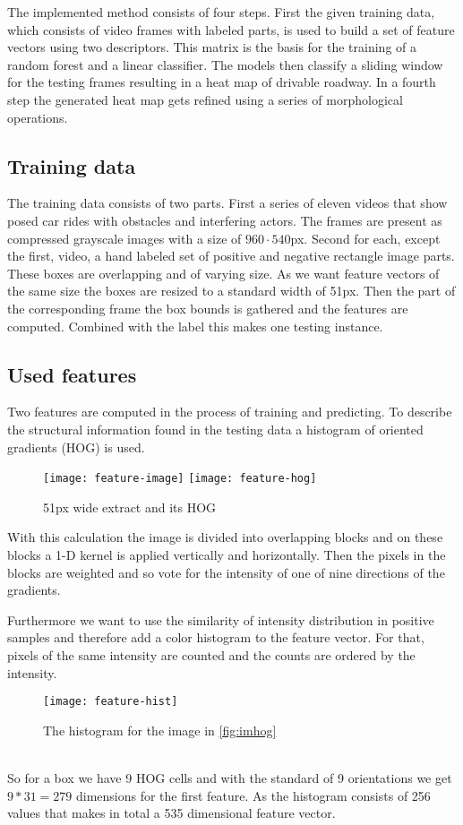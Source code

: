 The implemented method consists of four steps. First the given training data, which consists of video frames with labeled parts, is used to build a set of feature vectors using two descriptors. This matrix is the basis for the training of a random forest and a linear classifier. The models then classify a sliding window for the testing frames resulting in a heat map of drivable roadway. In a fourth step the generated heat map gets refined using a series of morphological operations.

\subsection{Training data} %
\label{sub:training_data}
The training data consists of two parts. First a series of eleven videos that show posed car rides with obstacles and interfering actors. The frames are present as compressed grayscale images with a size of $960\cdot 540$px. Second for each, except the first, video, a hand labeled set of positive and negative rectangle image parts. These boxes are overlapping and of varying size. As we want feature vectors of the same size the boxes are resized to a standard width of 51px. Then  the part of the corresponding frame the box bounds is gathered and the features are computed. Combined with the label this makes one testing instance.

\subsection{Used features} %
\label{sub:used_features}
Two features are computed in the process of training and predicting. To describe the structural information found in the testing data a histogram of oriented gradients\cite{uoctti} (HOG) is used.
\begin{figure}[h]
	\centering
	\texttt{[image: feature-image]}
	\texttt{[image: feature-hog]}
	\caption{51px wide extract and its HOG}
	\label{fig:imhog}
\end{figure}
With this calculation the image is divided into overlapping blocks and on these blocks a 1-D kernel is applied vertically and horizontally. Then the pixels in the blocks are weighted and so vote for the intensity of one of nine directions of the gradients.

Furthermore we want to use the similarity of intensity distribution in positive samples and therefore add a color histogram to the feature vector. For that, pixels of the same intensity are counted and the counts are ordered by the intensity.
{\begin{figure}[h]
	\centering
	\texttt{[image: feature-hist]}
	\caption{The histogram for the image in \autoref{fig:imhog}}
	\label{fig:limhist}
\end{figure}}\\
So for a box we have 9 HOG cells and with the standard of 9 orientations we get $9*31 = 279$ dimensions for the first feature. As the histogram consists of 256 values that makes in total a 535 dimensional feature vector.

